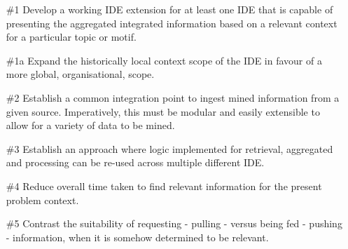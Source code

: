 \begin{enumerate}
	\item[\#1] Develop a working IDE extension for at least one IDE that is capable of presenting the aggregated integrated information based on a relevant context for a particular topic or motif.
	
	\item[\#1a] Expand the historically local context scope of the IDE in favour of a more global, organisational, scope.
	
	\item[\#2] Establish a common integration point to ingest mined information from a given source. Imperatively, this must be modular and easily extensible to allow for a variety of data to be mined.
	
	\item[\#3] Establish an approach where logic implemented for retrieval, aggregated and processing can be re-used across multiple different IDE.
	
	\item[\#4] Reduce overall time taken to find relevant information for the present problem context.
	
	\item[\#5] Contrast the suitability of requesting - pulling - versus being fed - pushing - information, when it is somehow determined to be relevant. 
	
\end{enumerate}